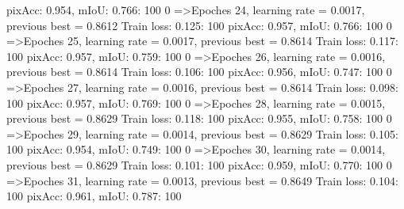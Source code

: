 pixAcc: 0.954, mIoU: 0.766: 100%
  0%
=>Epoches 24, learning rate = 0.0017,                 previous best = 0.8612
Train loss: 0.125: 100%
pixAcc: 0.957, mIoU: 0.766: 100%
  0%
=>Epoches 25, learning rate = 0.0017,                 previous best = 0.8614
Train loss: 0.117: 100%
pixAcc: 0.957, mIoU: 0.759: 100%
  0%
=>Epoches 26, learning rate = 0.0016,                 previous best = 0.8614
Train loss: 0.106: 100%
pixAcc: 0.956, mIoU: 0.747: 100%
  0%
=>Epoches 27, learning rate = 0.0016,                 previous best = 0.8614
Train loss: 0.098: 100%
pixAcc: 0.957, mIoU: 0.769: 100%
  0%
=>Epoches 28, learning rate = 0.0015,                 previous best = 0.8629
Train loss: 0.118: 100%
pixAcc: 0.955, mIoU: 0.758: 100%
  0%
=>Epoches 29, learning rate = 0.0014,                 previous best = 0.8629
Train loss: 0.105: 100%
pixAcc: 0.954, mIoU: 0.749: 100%
  0%
=>Epoches 30, learning rate = 0.0014,                 previous best = 0.8629
Train loss: 0.101: 100%
pixAcc: 0.959, mIoU: 0.770: 100%
  0%
=>Epoches 31, learning rate = 0.0013,                 previous best = 0.8649
Train loss: 0.104: 100%
pixAcc: 0.961, mIoU: 0.787: 100%
